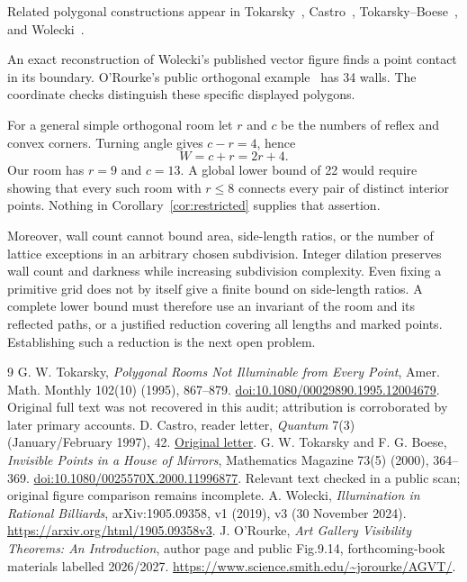 \documentclass[11pt]{article}
\theoremstyle{definition}\newtheorem{definition}[theorem]{Definition}
\begin{document}
Related polygonal constructions appear in Tokarsky~\cite{tokarsky}, Castro~\cite{castro}, Tokarsky--Boese~\cite{boese}, and Wolecki~\cite{wolecki}.

An exact reconstruction of Wolecki's published vector figure finds a point contact in its boundary. O'Rourke's public orthogonal example~\cite{orourke} has 34 walls. The coordinate checks distinguish these specific displayed polygons.

For a general simple orthogonal room let $r$ and $c$ be the numbers of reflex and convex corners. Turning angle gives $c-r=4$, hence
\[
 W=c+r=2r+4.
\]
Our room has $r=9$ and $c=13$. A global lower bound of 22 would require showing that every such room with $r\le8$ connects every pair of distinct interior points. Nothing in Corollary~\ref{cor:restricted} supplies that assertion.

Moreover, wall count cannot bound area, side-length ratios, or the number of lattice exceptions in an arbitrary chosen subdivision. Integer dilation preserves wall count and darkness while increasing subdivision complexity. Even fixing a primitive grid does not by itself give a finite bound on side-length ratios. A complete lower bound must therefore use an invariant of the room and its reflected paths, or a justified reduction covering all lengths and marked points. Establishing such a reduction is the next open problem.

\clearpage
\begin{thebibliography}{9}\small
{} G. W. Tokarsky, \emph{Polygonal Rooms Not Illuminable from Every Point}, Amer. Math. Monthly 102(10) (1995), 867--879. \href{https://doi.org/10.1080/00029890.1995.12004679}{doi:10.1080/00029890.1995.12004679}. Original full text was not recovered in this audit; attribution is corroborated by later primary accounts.
 D. Castro, reader letter, \emph{Quantum} 7(3) (January/February 1997), 42. \href{https://static.nsta.org/pdfs/QuantumV7N3.pdf\#page=44}{Original letter}.
 G. W. Tokarsky and F. G. Boese, \emph{Invisible Points in a House of Mirrors}, Mathematics Magazine 73(5) (2000), 364--369. \href{https://doi.org/10.1080/0025570X.2000.11996877}{doi:10.1080/0025570X.2000.11996877}. Relevant text checked in a public scan; original figure comparison remains incomplete.
 A. Wolecki, \emph{Illumination in Rational Billiards}, arXiv:1905.09358, v1 (2019), v3 (30 November 2024). \url{https://arxiv.org/html/1905.09358v3}.
 J. O'Rourke, \emph{Art Gallery Visibility Theorems: An Introduction}, author page and public Fig.9.14, forthcoming-book materials labelled 2026/2027. \url{https://www.science.smith.edu/~jorourke/AGVT/}.
\end{thebibliography}
\end{document}
